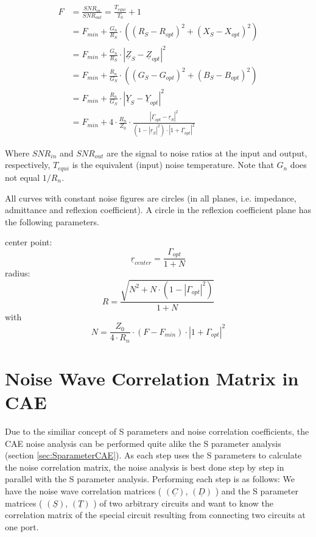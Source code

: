 \documentclass[10pt]{report}
\begin{document}
\begin{align}
  F & = \frac{SNR_{in}}{SNR_{out}} = \frac{T_{equi}}{T_0} + 1\\
    & = F_{min} + \frac{G_n}{R_S}\cdot\left( (R_S-R_{opt})^2 + (X_S-X_{opt})^2 \right)\\
    & = F_{min} + \frac{G_n}{R_S}\cdot\left| \underline{Z}_S - \underline{Z}_{opt} \right| ^2\\
    & = F_{min} + \frac{R_n}{G_S}\cdot\left( (G_S-G_{opt})^2 + (B_S-B_{opt})^2 \right)\\
    & = F_{min} + \frac{R_n}{G_S}\cdot\left| \underline{Y}_S - \underline{Y}_{opt} \right| ^2\\
    & = F_{min} + 4\cdot\frac{R_n}{Z_0}\cdot\frac{\left| \underline{\Gamma}_{opt}-\underline{r}_S\right| ^2}
                  {\left( 1-|\underline{r}_S|^2\right)\cdot\left| 1+\underline{\Gamma}_{opt}\right| ^2}
\end{align}

Where $SNR_{in}$ and $SNR_{out}$ are the signal to noise ratios at the
input and output, respectively, $T_{equi}$ is the equivalent (input)
noise temperature.  Note that $G_n$ does not equal $1/R_n$.

\addvspace{12pt}

All curves with constant noise figures are circles (in all planes,
i.e. impedance, admittance and reflexion coefficient).  A circle in
the reflexion coefficient plane has the following parameters.

\addvspace{12pt}

center point:
\begin{equation}
\underline{r}_{center} = \frac{\Gamma_{opt}}{1+N}
\end{equation}
radius:
\begin{equation}
R = \frac{\sqrt{N^2 + N\cdot(1-|\Gamma_{opt}|^2)}}{1+N}
\end{equation}
with
\begin{equation}
N = \frac{Z_0}{4\cdot R_n}\cdot (F-F_{min})\cdot |1+\Gamma_{opt}|^2
\end{equation}


\section{Noise Wave Correlation Matrix in CAE}

Due to the similiar concept of S parameters and noise correlation
coefficients, the CAE noise analysis can be performed quite alike the
S parameter analysis (section \ref{sec:SparameterCAE}). As each step
uses the S parameters to calculate the noise correlation matrix, the
noise analysis is best done step by step in parallel with the S
parameter analysis.  Performing each step is as follows: We have the
noise wave correlation matrices ( $(\underline{C})$, $(\underline{D})$
) and the S parameter matrices ( $(\underline{S})$, $(\underline{T})$
) of two arbitrary circuits and want to know the correlation matrix of
the special circuit resulting from connecting two circuits at one
port.
\end{document}
